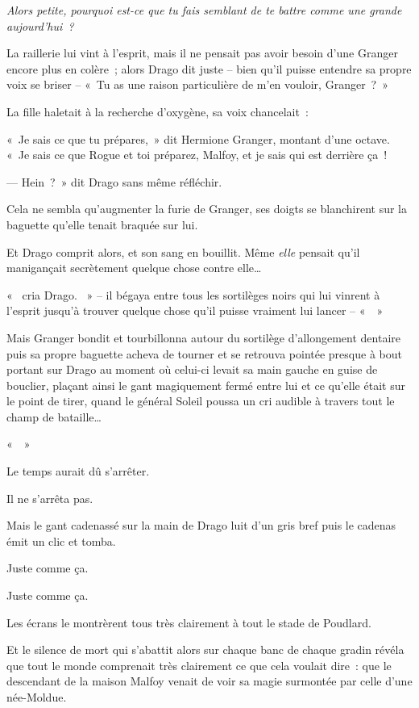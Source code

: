 \emph{Alors petite, pourquoi est-ce que tu fais semblant de te battre comme une grande aujourd'hui~?}

La raillerie lui vint à l'esprit, mais il ne pensait pas avoir besoin d'une Granger encore plus en colère~; alors Drago dit juste -- bien qu'il puisse entendre sa propre voix se briser -- «~Tu as une raison particulière de m'en vouloir, Granger~?~»

La fille haletait à la recherche d'oxygène, sa voix chancelait~:

«~Je sais ce que tu prépares,~» dit Hermione Granger, montant d'une octave.
«~Je sais ce que Rogue et toi préparez, Malfoy, et je sais qui est derrière ça~!

--- Hein~?~»
dit Drago sans même réfléchir.

Cela ne sembla qu'augmenter la furie de Granger, ses doigts se blanchirent sur la baguette qu'elle tenait braquée sur lui.

Et Drago comprit alors, et son sang en bouillit.
Même \emph{elle} pensait qu'il manigançait secrètement quelque chose contre elle…

«~ cria Drago.
~» -- il bégaya entre tous les sortilèges noirs qui lui vinrent à l'esprit jusqu'à trouver quelque chose qu'il puisse vraiment lui lancer -- «~~»

Mais Granger bondit et tourbillonna autour du sortilège d'allongement dentaire puis sa propre baguette acheva de tourner et se retrouva pointée presque à bout portant sur Drago au moment où celui-ci levait sa main gauche en guise de bouclier, plaçant ainsi le gant magiquement fermé entre lui et ce qu'elle était sur le point de tirer, quand le général Soleil poussa un cri audible à travers tout le champ de bataille…

«~~»

Le temps aurait dû s'arrêter.

Il ne s'arrêta pas.

Mais le gant cadenassé sur la main de Drago luit d'un gris bref puis le cadenas émit un clic et tomba.

Juste comme ça.

Juste comme ça.

Les écrans le montrèrent tous très clairement à tout le stade de Poudlard.

Et le silence de mort qui s'abattit alors sur chaque banc de chaque gradin révéla que tout le monde comprenait très clairement ce que cela voulait dire~: que le descendant de la maison Malfoy venait de voir sa magie surmontée par celle d'une née-Moldue.

